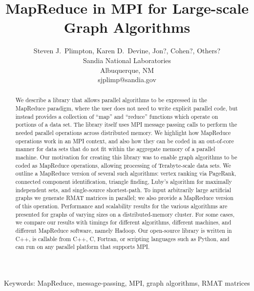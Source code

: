 \documentclass[11pt]{article}
\begin{document}
\title{Map{R}educe in {MPI} for Large-scale Graph Algorithms}

\author{
Steven J.~Plimpton, Karen D.~Devine, Jon?, Cohen?, Others? \\
Sandia National Laboratories \\
Albuquerque, NM \\
sjplimp@sandia.gov
}

\date{}

\maketitle

\centerline{Keywords: MapReduce, message-passing, MPI, graph
algorithms, RMAT matrices}

\vspace*{0.4in}

\begin{abstract}

We describe a library that allows parallel algorithms to be expressed
in the MapReduce paradigm, where the user does not need to write
explicit parallel code, but instead provides a collection of ``map''
and ``reduce'' functions which operate on portions of a data set.  The
library itself uses MPI message passing calls to perform the needed
parallel operations across distributed memory.  We highlight how
MapReduce operations work in an MPI context, and also how they can be
coded in an out-of-core manner for data sets that do not fit within
the aggregate memory of a parallel machine.  Our motivation for
creating this library was to enable graph algorithms to be coded as
MapReduce operations, allowing processing of Terabyte-scale data sets.
We outline a MapReduce version of several such algorithms: vertex
ranking via PageRank, connected component identification, triangle
finding, Luby's algorithm for maximally independent sets, and
single-source shortest-path.  To input arbitrarily large artificial
graphs we generate RMAT matrices in parallel; we also provide a
MapReduce version of this operation.  Performance and scalability
results for the various algorithms are presented for graphs of varying
sizes on a distributed-memory cluster.  For some cases, we compare our
results with timings for different algorithms, different machines, and
different MapReduce software, namely Hadoop.  Our open-source library
is written in C++, is callable from C++, C, Fortran, or scripting
languages such as Python, and can run on any parallel platform that
supports MPI.

\end{abstract}

\pagebreak










\end{document}

